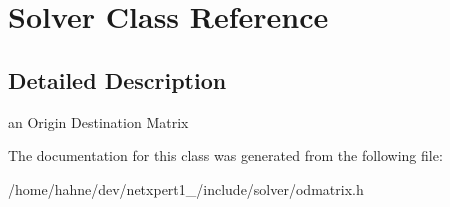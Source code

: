\hypertarget{classSolver}{}\section{Solver Class Reference}
\label{classSolver}


\subsection{Detailed Description}
an Origin Destination Matrix 

The documentation for this class was generated from the following file\+:\begin{DoxyCompactItemize}
\item 
/home/hahne/dev/netxpert1\+\_/include/solver/odmatrix.\+h\end{DoxyCompactItemize}
